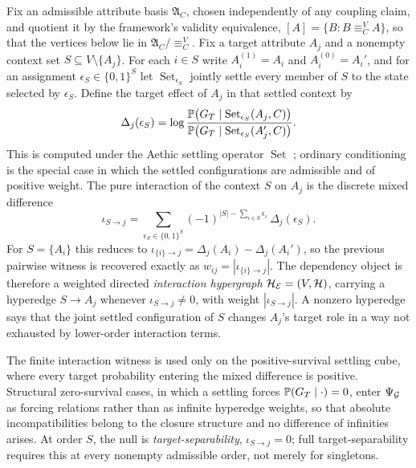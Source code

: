 \begin{definition}\label{def:exotic}
Fix an admissible attribute basis $\mathfrak A_C$, chosen independently
of any coupling claim, and quotient it by the framework's validity
equivalence, $[A]=\{B:B\equiv^{V}_{C}A\}$, so that the vertices below
lie in $\mathfrak A_C/{\equiv^{V}_{C}}$. Fix a target attribute $A_j$
and a nonempty context set $S\subseteq V\setminus\{A_j\}$. For each
$i\in S$ write $A_i^{(1)}=A_i$ and $A_i^{(0)}=A_i'$, and for an
assignment $\epsilon_S\in\{0,1\}^{S}$ let
$\operatorname{Set}_{\epsilon_S}$ jointly settle every member of $S$
to the state selected by $\epsilon_S$. Define the target effect of
$A_j$ in that settled context by
\[
\Delta_j(\epsilon_S)=
\log\frac{\mathbb{P}\bigl(G_T\mid
\operatorname{Set}_{\epsilon_S}(A_j,C)\bigr)}
{\mathbb{P}\bigl(G_T\mid
\operatorname{Set}_{\epsilon_S}(A_j',C)\bigr)}.
\]
This is computed under the Aethic settling operator
$\operatorname{Set}$ \cite{Aethus}; ordinary conditioning is the
special case in which the settled configurations are admissible and of
positive weight. The pure interaction of the context $S$ on $A_j$ is
the discrete mixed difference
\[
\iota_{S\to j}
=
\sum_{\epsilon_S\in\{0,1\}^{S}}
(-1)^{|S|-\sum_{i\in S}\epsilon_i}\,
\Delta_j(\epsilon_S).
\]
For $S=\{A_i\}$ this reduces to
$\iota_{\{i\}\to j}=\Delta_j(A_i)-\Delta_j(A_i')$, so the previous
pairwise witness is recovered exactly as
$w_{ij}=|\iota_{\{i\}\to j}|$. The dependency object is therefore a
weighted directed \emph{interaction hypergraph}
$\mathcal H_{\mathcal{E}}=(V,\mathcal H)$, carrying a hyperedge
$S\to A_j$ whenever $\iota_{S\to j}\neq0$, with weight
$|\iota_{S\to j}|$. A nonzero hyperedge says that the joint settled
configuration of $S$ changes $A_j$'s target role in a way not exhausted
by lower-order interaction terms.

The finite interaction witness is used only on the positive-survival
settling cube, where every target probability entering the mixed
difference is positive. Structural zero-survival cases, in which a
settling forces $\mathbb{P}(G_T\mid\cdot)=0$, enter $\Psi_{\mathcal{G}}$ as forcing
relations rather than as infinite hyperedge weights, so that absolute
incompatibilities belong to the closure structure and no difference of
infinities arises. At order $S$, the null is \emph{target-separability},
$\iota_{S\to j}=0$; full target-separability requires this at every
nonempty admissible order, not merely for singletons.


\end{definition}
